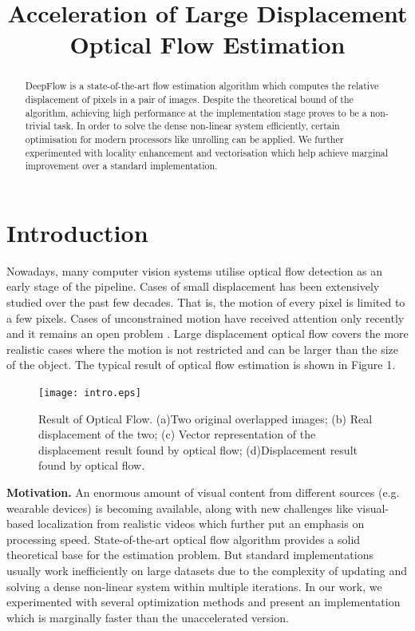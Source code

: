 \documentclass[letterpaper]{article}
\title{Acceleration of Large Displacement Optical Flow Estimation}
\newcommand{\mypar}[1]{{\bf #1.}}
\begin{document}
%
\maketitle
%

\begin{abstract}

DeepFlow \cite{Weinzaepfel:2013:DLD:2586117.2586991} is a state-of-the-art flow estimation algorithm which 
computes the relative displacement of pixels in a pair of images. Despite the theoretical bound of the algorithm, achieving high performance at the implementation stage proves to be a non-trivial task. In order to solve the dense non-linear system efficiently, certain optimisation for modern processors like unrolling can be applied. We further experimented with locality enhancement and vectorisation which help achieve marginal improvement over a standard implementation.  
\end{abstract}

\section{Introduction}\label{sec:intro}

Nowadays, many computer vision systems utilise optical flow detection as an early stage of the pipeline. Cases of small displacement has been extensively studied over the past few decades. That is, the motion of every pixel is limited to a few pixels. Cases of unconstrained motion have received attention only recently and it remains an open problem \cite{Brox:2011:LDO:1936329.1936562, 5539820}. Large displacement optical flow covers the more realistic cases where the motion is not restricted and can be larger than the size of the object. The typical result of optical flow estimation is shown in Figure 1.
\begin{figure}[H]\centering
  \texttt{[image: intro.eps]}
  \caption{Result of Optical Flow. (a)Two original overlapped images; (b) Real displacement of the two; (c) Vector representation of the displacement result found by optical flow; (d)Displacement result found by optical flow.}
\end{figure}

\mypar{Motivation}
An enormous amount of visual content from different sources (e.g. wearable devices) is becoming available, along with new challenges like visual-based localization from realistic videos which further put an emphasis on processing speed. State-of-the-art optical flow algorithm provides a solid theoretical base for the estimation problem. But standard implementations usually work inefficiently on large datasets due to the complexity of updating and solving a dense non-linear system within multiple iterations. In our work, we experimented with several optimization methods and present an implementation which is marginally faster than the unaccelerated version.
\end{document}
